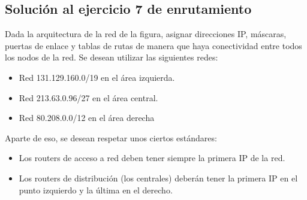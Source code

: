 \documentclass[letterpaper,10pt,spanish]{sphinxmanual}
\begin{document}
\subsection{Solución al ejercicio 7 de enrutamiento}
\label{\detokenize{t2_integracion_elementos/ejercicios_subredes_ipv4/ejercicios_dos_router:solucion-al-ejercicio-7-de-enrutamiento}}
\sphinxAtStartPar
Dada la arquitectura de la red de la figura, asignar direcciones IP, máscaras, puertas de enlace y tablas de rutas de manera que haya conectividad entre todos
los nodos de la red. Se desean utilizar las siguientes redes:
\begin{itemize}
\item {} 
\sphinxAtStartPar
Red 131.129.160.0/19 en el área izquierda.

\item {} 
\sphinxAtStartPar
Red 213.63.0.96/27 en el área central.

\item {} 
\sphinxAtStartPar
Red 80.208.0.0/12 en el área derecha

\end{itemize}

\begin{figure}[htbp]
\centering

\noindent{}
\end{figure}

\sphinxAtStartPar
Aparte de eso, se desean respetar unos ciertos estándares:
\begin{itemize}
\item {} 
\sphinxAtStartPar
Los routers de acceso a red deben tener siempre la primera IP de la red.

\item {} 
\sphinxAtStartPar
Los routers de distribución (los centrales) deberán tener la primera IP en el punto izquierdo y la última en el derecho.

\end{itemize}
\end{document}
